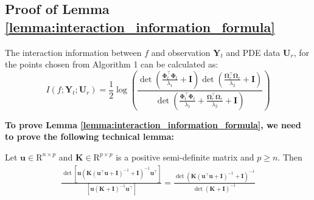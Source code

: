 \subsection{Proof of Lemma \ref{lemma:interaction_information_formula}}
\begin{lemma}
    \label{lemma:interaction_information_formula}
    The interaction information between $f$ and observation $\mathbf{Y}_t$ and PDE data $\mathbf{U}_r$, for the points chosen from Algorithm 1 can be calculated as:
    \begin{equation*}
        I (f; \mathbf{Y}_t; \mathbf{U}_r) = \frac{1}{2}  \log (\frac{\det(\frac{\boldsymbol{\Phi}_t^\top \boldsymbol{\Phi}_t}{\lambda_1} + \mathbf{I})\det(\frac{\boldsymbol{\Omega}_r^\top \boldsymbol{\Omega}_r}{\lambda_2} + \mathbf{I})}{\det(\frac{\boldsymbol{\Phi}_t^\top \boldsymbol{\Phi}_t}{\lambda_1} + \frac{\boldsymbol{\Omega}_r^\top \boldsymbol{\Omega}_r}{\lambda_2} + \mathbf{I})})
    \end{equation*}
\end{lemma}
\textbf{To prove Lemma \ref{lemma:interaction_information_formula}, we need to prove the following technical lemma:}
\begin{sublemma}    \label{lemma:det_division}
    Let $\mathbf{u} \in \mathrm{R}^{n \times p}$ and $\mathbf{K} \in \mathrm{R}^{p \times p}$ is a positive semi-definite matrix and $p \ge n$. Then 
    \begin{align}
    \frac{\det [\mathbf{u}\left(\mathbf{K}(\mathbf{u}^\top\mathbf{u}+\mathbf{I})^{-1} + \mathbf{I}\right)^{-1}\mathbf{u}^\top]}{[\mathbf{u}\left(\mathbf{K} + \mathbf{I}\right)^{-1}\mathbf{u}^\top]} =  \frac{\det \left(\mathbf{K}(\mathbf{u}^\top\mathbf{u}+\mathbf{I})^{-1} + \mathbf{I}\right)^{-1}}{\det \left(\mathbf{K} + \mathbf{I}\right)^{-1}}   
    \end{align}
\end{sublemma}
